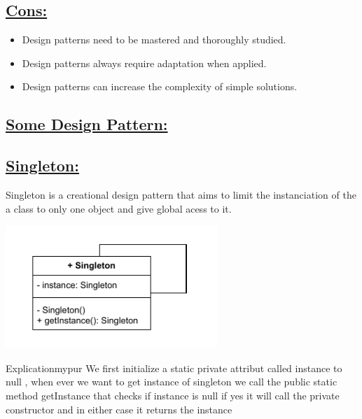 \vspace{0.25cm}

\subsection*{\underline{Cons:}}
\begin{itemize}
    \item Design patterns need to be mastered and thoroughly studied.
    \item Design patterns always require adaptation when applied.
    \item Design patterns can increase the complexity of simple solutions.
\end{itemize}

\newpage
\subsection*{\underline{Some Design Pattern:}}

\subsection*{\underline{Singleton:}}
Singleton is a creational design pattern that aims to limit the instanciation
of the a class to only one object and give global acess to it.

\begin{center}
\includegraphics[width=0.6\textwidth,height=0.35\textheight]{Chapters/DesignPattern/Singleton/single.drawio.pdf}
\end{center}

\begin{prettyBox}{Explication}{mypur}
We first initialize a static private attribut called instance to null , when ever we want to get instance of singleton
we call the public static method getInstance that checks if instance is null if yes it will call the private constructor
and in either case it returns the instance 
\end{prettyBox}

